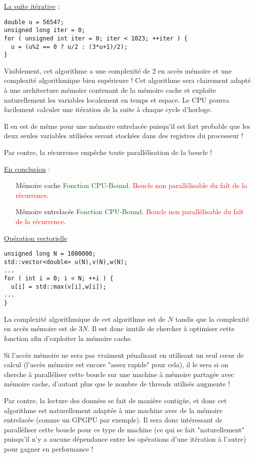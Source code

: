 \documentclass[fleqn,11pt]{article}
\begin{document}
\underline{La suite itérative} :

\begin{lstlisting}
double u = 56547;
unsigned long iter = 0;
for ( unsigned int iter = 0; iter < 1023; ++iter ) {
  u = (u%2 == 0 ? u/2 : (3*u+1)/2);
}
\end{lstlisting}

Visiblement, cet algorithme a une complexité de 2 en accès mémoire et une complexité algorithmique bien supérieure ! Cet algorithme sera clairement adapté à une architecture mémoire contenant de la mémoire cache
et exploite naturellement les variables  localement en temps et espace. Le CPU pourra facilement calculer une itération de la suite à chaque cycle d'horloge. 

Il en est de même pour une mémoire entrelacée puisqu'il est fort probable que les deux seules variables utilisées seront stockées dans des registres du processeur !

Par contre, la récurrence empêche toute parallélisation de la boucle !

\underline{En conclusion} :
\begin{itemize}
\item [Mémoire cache] \textcolor{darkgreen}{Fonction CPU-Bound}. \textcolor{red}{Boucle non parallélisable du faît de la récurrence}.
\item [Mémoire entrelacée] \textcolor{darkgreen}{Fonction CPU-Bound}. \textcolor{red}{Boucle non parallélisable du faît de la récurrence}.
\end{itemize}

\underline{Opération vectorielle}

\begin{lstlisting}
unsigned long N = 1000000;
std::vector<double> u(N),v(N),w(N);
...
for ( int i = 0; i < N; ++i ) {
  u[i] = std::max(v[i],w[i]);
...
}
\end{lstlisting}

La complexité algorithmique de cet algorithme est de $N$ tandis que la complexité en accès mémoire
est de $3N$. Il est donc inutile de chercher à optimiser cette fonction afin d'exploiter la mémoire cache.

Si l'accès mémoire ne sera pas vraiment pénalisant en utilisant un seul c{\oe}ur de calcul (l'accès mémoire est encore "assez rapide" pour cela), il le sera si on cherche à paralléliser cette boucle sur une machine à mémoire partagée avec mémoire cache, d'autant plus que le nombre de threads utilisés augmente !

Par contre, la lecture des données se fait de manière contigüe, et donc cet algorithme est naturellement
adaptée à une machine avec de la mémoire entrelacée (comme un GPGPU par exemple). Il sera donc intéressant
de paralléliser cette boucle pour ce type de machine (ce qui se fait "naturellement" puisqu'il n'y a aucune
dépendance entre les opérations d'une itération à l'autre) pour gagner en performance !
\end{document}
